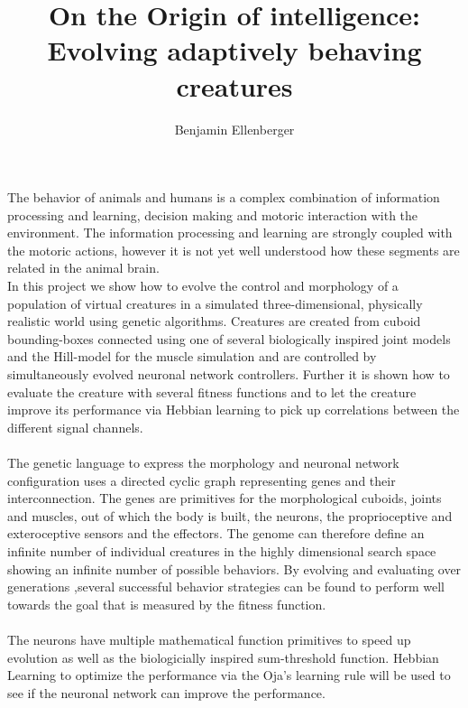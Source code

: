 \documentclass[11pt]{article}
\title{\textbf{On the Origin of intelligence:\\ Evolving adaptively behaving creatures}}
\author{Benjamin Ellenberger}
\date{}
\begin{document}
\maketitle


The behavior of animals and humans is a complex combination of information processing and learning, decision making and motoric interaction with the environment. The information processing and learning are strongly coupled with the motoric actions, however it is not yet well understood how these segments are related in the animal brain.
\\
In this project we show how to evolve the control and morphology of a population of virtual creatures in a simulated three-dimensional, physically realistic world using genetic algorithms. Creatures are created from cuboid bounding-boxes connected using one of several biologically inspired joint models and the Hill-model for the muscle simulation and are controlled by simultaneously evolved neuronal network controllers. Further it is shown how to evaluate the creature with several fitness functions and to let the creature improve its performance via Hebbian learning to pick up correlations between the different signal channels.
\\\\
The genetic language to express the morphology and neuronal network configuration uses a directed cyclic graph representing genes and their interconnection. The genes are primitives for the morphological cuboids, joints and muscles, out of which the body is built, the neurons, the proprioceptive and exteroceptive sensors and the effectors.
The genome can therefore define an infinite number of individual creatures in the highly dimensional search space showing an infinite number of possible behaviors. By evolving and evaluating over generations ,several successful behavior strategies can be found to perform well towards the goal that is measured by the fitness function.
\\\\
The neurons have multiple mathematical function primitives to speed up evolution as well as the biologicially inspired sum-threshold function. Hebbian Learning to optimize the performance via the Oja's learning rule will be used to see if the neuronal network can improve the performance.
\\\\
\end{document}
